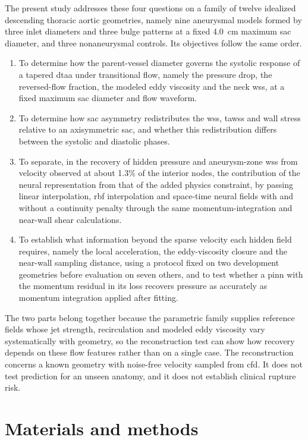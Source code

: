 \documentclass[12pt,a4paper]{article}
\newcommand{\CFD}{\ac{cfd}\xspace}
\newcommand{\PINN}{\ac{pinn}\xspace}
\newcommand{\DTAA}{\ac{dtaa}\xspace}
\newcommand{\WSS}{\ac{wss}\xspace}
\newcommand{\TAWSS}{\ac{tawss}\xspace}
\newcommand{\RBF}{\ac{rbf}\xspace}
\theoremstyle{definition}
\numberwithin{equation}{section}
\begin{document}
The present study addresses these four questions on a family of twelve idealized descending thoracic aortic geometries, namely nine aneurysmal models formed by three inlet diameters and three bulge patterns at a fixed 4.0~cm maximum sac diameter, and three nonaneurysmal controls. Its objectives follow the same order.
\begin{enumerate}
\item To determine how the parent-vessel diameter governs the systolic response of a tapered \DTAA under transitional flow, namely the pressure drop, the reversed-flow fraction, the modeled eddy viscosity and the neck \WSS, at a fixed maximum sac diameter and flow waveform.
\item To determine how sac asymmetry redistributes the \WSS, \TAWSS and wall stress relative to an axisymmetric sac, and whether this redistribution differs between the systolic and diastolic phases.
\item To separate, in the recovery of hidden pressure and aneurysm-zone \WSS from velocity observed at about 1.3\% of the interior nodes, the contribution of the neural representation from that of the added physics constraint, by passing linear interpolation, \RBF interpolation and space-time neural fields with and without a continuity penalty through the same momentum-integration and near-wall shear calculations.
\item To establish what information beyond the sparse velocity each hidden field requires, namely the local acceleration, the eddy-viscosity closure and the near-wall sampling distance, using a protocol fixed on two development geometries before evaluation on seven others, and to test whether a \PINN with the momentum residual in its loss recovers pressure as accurately as momentum integration applied after fitting.
\end{enumerate}
The two parts belong together because the parametric family supplies reference fields whose jet strength, recirculation and modeled eddy viscosity vary systematically with geometry, so the reconstruction test can show how recovery depends on these flow features rather than on a single case. The reconstruction concerns a known geometry with noise-free velocity sampled from \CFD. It does not test prediction for an unseen anatomy, and it does not establish clinical rupture risk.
\fi

\section{\label{Material and Methods}Materials and methods}
\end{document}
